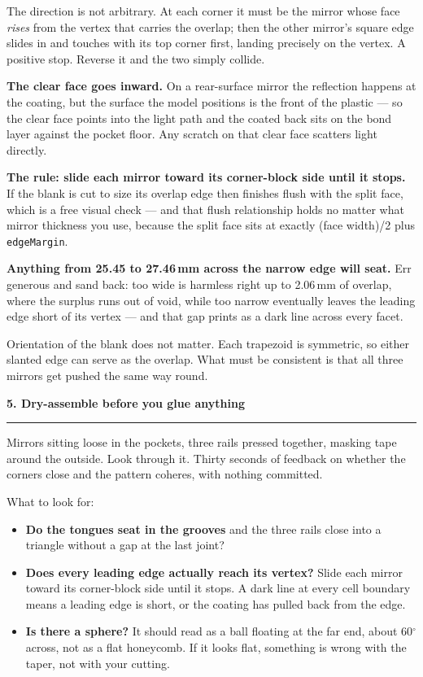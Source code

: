 \documentclass[letterpaper,11pt]{article}
\newcommand{\head}[1]{\vspace{3mm}\textbf{\large #1}\vspace{1mm}\hrule\vspace{2mm}}
\begin{document}
The direction is not arbitrary. At each corner it must be the mirror whose face \emph{rises}
from the vertex that carries the overlap; then the other mirror's square edge slides in and
touches with its top corner first, landing precisely on the vertex. A positive stop. Reverse
it and the two simply collide.

\textbf{The clear face goes inward.} On a rear-surface mirror the reflection happens at the
coating, but the surface the model positions is the front of the plastic --- so the clear
face points into the light path and the coated back sits on the bond layer against the
pocket floor. Any scratch on that clear face scatters light directly.

\textbf{The rule: slide each mirror toward its corner-block side until it stops.} If the
blank is cut to size its overlap edge then finishes flush with the split face, which is a
free visual check --- and that flush relationship holds no matter what mirror thickness you
use, because the split face sits at exactly (face width)/2 plus \texttt{edgeMargin}.

\textbf{Anything from 25.45 to 27.46\,mm across the narrow edge will seat.} Err generous and
sand back: too wide is harmless right up to 2.06\,mm of overlap, where the surplus runs out
of void, while too narrow eventually leaves the leading edge short of its vertex --- and that
gap prints as a dark line across every facet.

Orientation of the blank does not matter. Each trapezoid is symmetric, so either slanted edge
can serve as the overlap. What must be consistent is that all three mirrors get pushed the
same way round.

\head{5. Dry-assemble before you glue anything}

Mirrors sitting loose in the pockets, three rails pressed together, masking tape around the
outside. Look through it. Thirty seconds of feedback on whether the corners close and the
pattern coheres, with nothing committed.

What to look for:

\begin{itemize}[leftmargin=*]
\item \textbf{Do the tongues seat in the grooves} and the three rails close into a triangle
      without a gap at the last joint?
\item \textbf{Does every leading edge actually reach its vertex?} Slide each mirror toward
      its corner-block side until it stops. A dark line at every cell boundary means a
      leading edge is short, or the coating has pulled back from the edge.
\item \textbf{Is there a sphere?} It should read as a ball floating at the far end, about
      60$^\circ$ across, not as a flat honeycomb. If it looks flat, something is wrong with
      the taper, not with your cutting.
\end{itemize}
\end{document}

